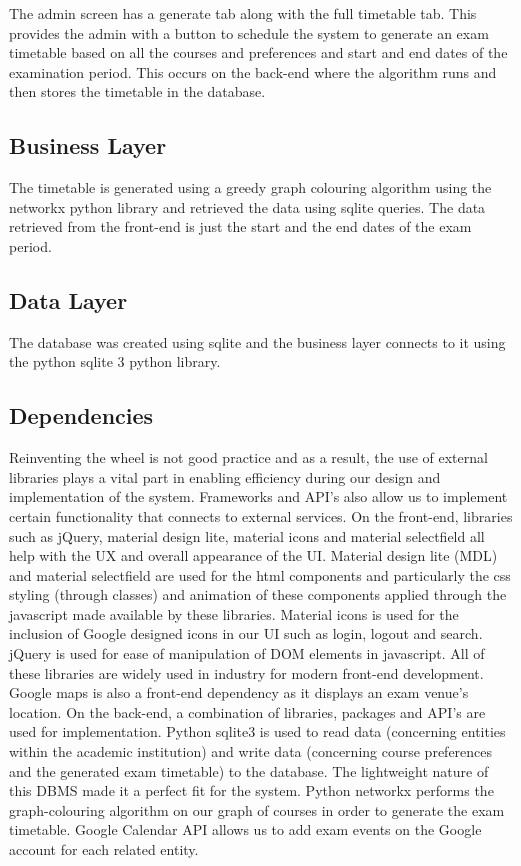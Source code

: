 The admin screen has a generate tab along with the full timetable tab. This provides the admin with a button to schedule the system to generate an exam timetable based on all the courses and preferences and start and end dates of the examination period. This occurs on the back-end where the algorithm runs and then stores the timetable in the database.

\subsection{Business Layer}

The timetable is generated using a greedy graph colouring algorithm using the networkx python library and retrieved the data using sqlite queries. The data retrieved from the front-end is just the start and the end dates of the exam period.

\subsection{Data Layer}

The database was created using sqlite and the business layer connects to it using the python sqlite 3 python library. 

\subsection{Dependencies}

Reinventing the wheel is not good practice and as a result, the use of external libraries plays a vital part in enabling efficiency during our design and implementation of the system. Frameworks and API’s also allow us to implement certain functionality that connects to external services.
On the front-end, libraries such as jQuery, material design lite, material icons and material selectfield all help with the UX and overall appearance of the UI. Material design lite (MDL) and material selectfield are used for the html components and particularly the css styling (through classes) and animation of these components applied through the javascript made available by these libraries. Material icons is used for the inclusion of Google designed icons in our UI such as login, logout and search. jQuery is used for ease of manipulation of DOM elements in javascript. All of these libraries are widely used in industry for modern front-end development. Google maps is also a front-end dependency as it displays an exam venue’s location.
On the back-end, a combination of libraries, packages and API’s are used for implementation. Python sqlite3 is used to read data (concerning entities within the academic institution) and write data (concerning course preferences and the generated exam timetable) to the database. The lightweight nature of this DBMS made it a perfect fit for the system. Python networkx performs the graph-colouring algorithm on our graph of courses in order to generate the exam timetable. Google Calendar API allows us to add exam events on the Google account for each related entity.


